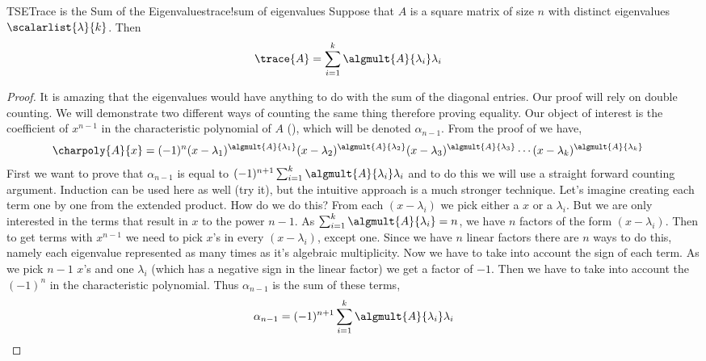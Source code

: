 %
\begin{theorem}{TSE}{Trace is the Sum of the Eigenvalues}{trace!sum of eigenvalues}
Suppose that $A$ is a square matrix of size $n$ with distinct eigenvalues $\scalarlist{\lambda}{k}$.  Then
%
\begin{align*}
\trace{A}
&=\sum_{i=1}^{k}\algmult{A}{\lambda_i}\lambda_i
\end{align*}
%
\end{theorem}
%
\begin{proof}
It is amazing that the eigenvalues would have anything to do with the sum of the diagonal entries.  Our proof will rely on double counting.  We will demonstrate two different ways of counting the same thing therefore proving equality.  Our object of interest is the coefficient of $x^{n-1}$ in the characteristic polynomial of $A$ (), which will be denoted $\alpha_{n-1}$.  From the proof of  we have,
%
\begin{align*}
\charpoly{A}{x}
&=(-1)^{n}
(x-\lambda_1)^{\algmult{A}{\lambda_1}}
(x-\lambda_2)^{\algmult{A}{\lambda_2}}
(x-\lambda_3)^{\algmult{A}{\lambda_3}}
\cdots
(x-\lambda_k)^{\algmult{A}{\lambda_k}}
\end{align*}
%
First we want to prove that $\alpha_{n-1}$ is equal to $(-1)^{n+1}\sum_{i=1}^{k}\algmult{A}{\lambda_i}\lambda_i$ and to do this we will use a straight forward counting argument. Induction can be used here as well (try it), but the intuitive approach is a much stronger technique. Let's imagine creating each term one by one from the extended product.  How do we do this? From each $(x-\lambda_i)$ we pick either a $x$ or a $\lambda_i$.  But we are only interested in the terms that result in $x$ to the power $n-1$.  As $\sum_{i=1}^k \algmult{A}{\lambda_i}=n$, we have $n$ factors of the form $(x-\lambda_i)$. Then to get terms with $x^{n-1}$ we need to pick $x$'s in every  $(x-\lambda_i)$, except one. Since we have $n$ linear factors there are $n$ ways to do this, namely each eigenvalue represented as many times as it's algebraic multiplicity.  Now we have to take into account the sign of each term. As we pick $n-1$ $x$'s and one $\lambda_i$ (which has a negative sign in the linear factor) we get a factor of $-1$.  Then we have to take into account the $(-1)^{n}$ in the characteristic polynomial. Thus $\alpha_{n-1}$ is the sum of these terms,
%
\begin{align*}
\alpha_{n-1}=(-1)^{n+1}\sum_{i=1}^{k}\algmult{A}{\lambda_i}\lambda_i
\end{align*}

\end{proof}

